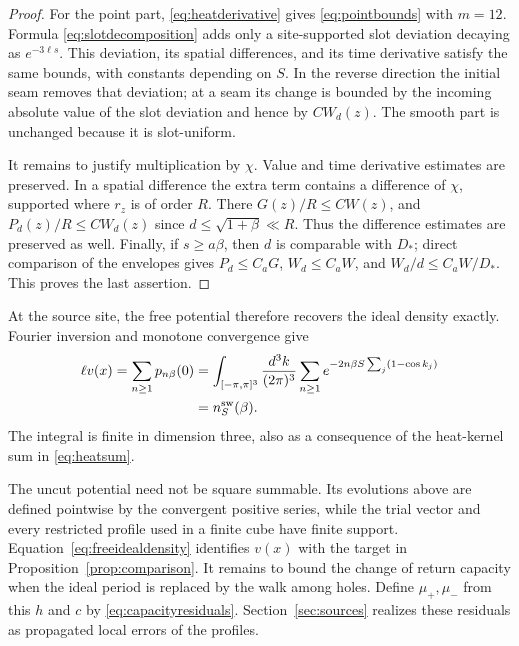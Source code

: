\begin{proof}
For the point part, \eqref{eq:heatderivative} gives
\eqref{eq:pointbounds} with $m=12$.  Formula
\eqref{eq:slotdecomposition} adds only a site-supported slot deviation
decaying as $e^{-3\ell s}$.  This deviation, its spatial differences,
and its time derivative satisfy the same bounds, with constants
depending on $S$.  In the reverse direction the initial seam removes
that deviation; at a seam its change is bounded by the incoming
absolute value of the slot deviation and hence by $C W_d(z)$.
The smooth part is unchanged
because it is slot-uniform.

It remains to justify multiplication by $\chi$.  Value and time
derivative estimates are preserved.  In a spatial difference the
extra term contains a difference of $\chi$, supported where
$r_z$ is of order $R$.  There
$G(z)/R\le C W(z)$, and
$P_d(z)/R\le C W_d(z)$ since $d\le\sqrt{1+\beta}\ll R$.
Thus the difference estimates are preserved as well.
Finally, if $s\ge a\beta$, then $d$ is comparable with $D_*$;
direct comparison of the envelopes gives
$P_d\le C_aG$, $W_d\le C_aW$, and
$W_d/d\le C_aW/D_*$.  This proves the last assertion.
\end{proof}

At the source site, the free potential therefore recovers the ideal
density exactly.  Fourier inversion and monotone convergence give
\begin{equation}\label{eq:freeidealdensity}
 \begin{split}
 \ell v(x)=\sum_{n\ge1}p_{n\beta}(0)
 &=\int_{[-\pi,\pi]^3}\frac{d^3k}{(2\pi)^3}
      \sum_{n\ge1}e^{-2n\beta S\sum_j(1-\cos k_j)}\\
 &=n_S^{\rm sw}(\beta).
 \end{split}
\end{equation}
The integral is finite in dimension three, also as a consequence of
the heat-kernel sum in \eqref{eq:heatsum}.

The uncut potential need not be square summable.  Its evolutions
above are defined pointwise by the convergent positive series, while
the trial vector and every restricted profile used in a finite cube
have finite support.
Equation~\eqref{eq:freeidealdensity} identifies $v(x)$ with the
target in Proposition~\ref{prop:comparison}.  It remains to bound
the change of return capacity when the ideal period is replaced by
the walk among holes.
Define $\mu_+,\mu_-$ from this $h$ and $c$ by
\eqref{eq:capacityresiduals}.  Section~\ref{sec:sources} realizes
these residuals as propagated local errors of the profiles.
